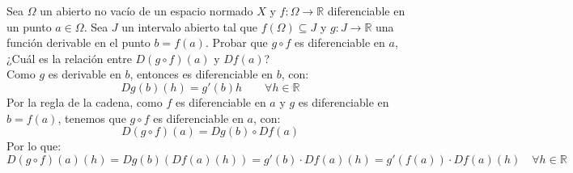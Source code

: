 \begin{ejercicio}
Sea \( \Omega \) un abierto no vacío de un espacio normado \( X \) y \( f : \Omega \rightarrow \mathbb{R} \) diferenciable en un punto \( a \in \Omega \). Sea \( J \) un intervalo abierto tal que \( f(\Omega) \subseteq J \) y \( g : J \rightarrow \mathbb{R} \) una función derivable en el punto \( b = f(a) \). Probar que \( g \circ f \) es diferenciable en \( a \), ¿Cuál es la relación entre \( D(g \circ f)(a) \) y \( Df(a) \)?\\

\noindent
Como $g$ es derivable en $b$, entonces es diferenciable en $b$, con:
\begin{equation*}
    Dg(b)(h) = g'(b)h \qquad \forall h\in \mathbb{R}
\end{equation*}
Por la regla de la cadena, como $f$ es diferenciable en $a$ y $g$ es diferenciable en $b = f(a)$, tenemos que $g\circ f$ es diferenciable en $a$, con:
\begin{equation*}
    D(g\circ f)(a) = Dg(b)\circ Df(a)
\end{equation*}
Por lo que:
\begin{equation*}
    D(g\circ f)(a)(h) = Dg(b)(Df(a)(h)) = g'(b)\cdot Df(a)(h) = g'(f(a)) \cdot Df(a)(h) \quad \forall h\in \mathbb{R}
\end{equation*}
\end{ejercicio}

